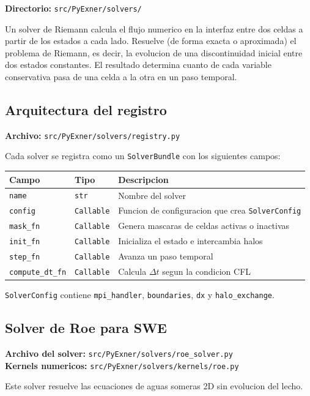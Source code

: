 \documentclass[11pt,a4paper]{article}
\newcommand{\code}[1]{\texttt{#1}}
\begin{document}
\textbf{Directorio:} \code{src/PyExner/solvers/}

Un solver de Riemann calcula el flujo numerico en la interfaz entre dos celdas a partir de los
estados a cada lado. Resuelve (de forma exacta o aproximada) el problema de Riemann, es decir,
la evolucion de una discontinuidad inicial entre dos estados constantes. El resultado determina
cuanto de cada variable conservativa pasa de una celda a la otra en un paso temporal.

\subsection{Arquitectura del registro}

\textbf{Archivo:} \code{src/PyExner/solvers/registry.py}

Cada solver se registra como un \code{SolverBundle} con los siguientes campos:

\begin{tabularx}{\textwidth}{L{3cm}L{3cm}Y}
\toprule
Campo & Tipo & Descripcion \\
\midrule
\code{name} & \code{str} & Nombre del solver \\
\code{config} & \code{Callable} & Funcion de configuracion que crea \code{SolverConfig} \\
\code{mask\_fn} & \code{Callable} & Genera mascaras de celdas activas o inactivas \\
\code{init\_fn} & \code{Callable} & Inicializa el estado e intercambia halos \\
\code{step\_fn} & \code{Callable} & Avanza un paso temporal \\
\code{compute\_dt\_fn} & \code{Callable} & Calcula $\Delta t$ segun la condicion CFL \\
\bottomrule
\end{tabularx}

\code{SolverConfig} contiene \code{mpi\_handler}, \code{boundaries}, \code{dx} y
\code{halo\_exchange}.

\subsection{Solver de Roe para SWE}

\textbf{Archivo del solver:} \code{src/PyExner/solvers/roe\_solver.py}\\
\textbf{Kernels numericos:} \code{src/PyExner/solvers/kernels/roe.py}

Este solver resuelve las ecuaciones de aguas someras 2D sin evolucion del lecho.
\end{document}
